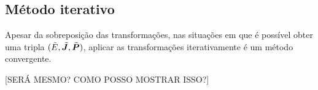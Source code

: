 \subsection{Método iterativo}
Apesar da sobreposição das transformações, nas situações em que é possível obter uma tripla $(\tilde E, \tilde{\bm J}, \tilde{\bm P})$, aplicar as transformações iterativamente é um método convergente.

[SERÁ MESMO? COMO POSSO MOSTRAR ISSO?]